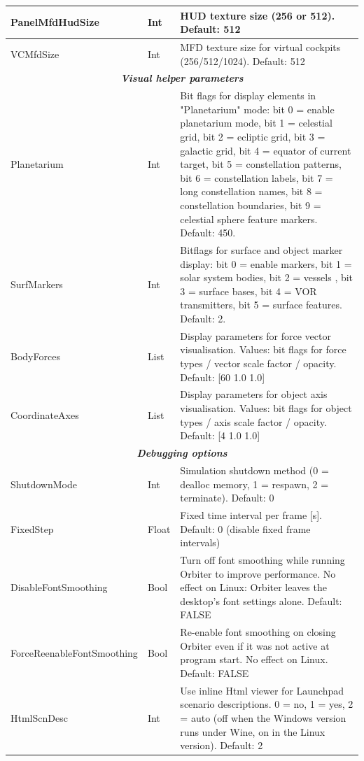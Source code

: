 \documentclass[Orbiter User Manual.tex]{subfiles}
\begin{document}
\begin{longtable}{ |p{}|p{}|p{}| }
	PanelMfdHudSize & Int & HUD texture size (256 or 512). Default: 512\\
	\hline\rule{0pt}{2ex}
	VCMfdSize & Int & MFD texture size for virtual cockpits (256/512/1024). Default: 512\\
	\hline
	\multicolumn{3}{|c|}{\rule{0pt}{2ex}\textbf{\textit{Visual helper parameters}}}\\
	\hline\rule{0pt}{2ex}
	Planetarium & Int & Bit flags for display elements in "Planetarium" mode: bit 0 = enable planetarium mode, bit 1 = celestial grid, bit 2 = ecliptic grid, bit 3 = galactic grid, bit 4 = equator of current target, bit 5 = constellation patterns, bit 6 = constellation labels, bit 7 = long constellation names, bit 8 = constellation boundaries, bit 9 = celestial sphere feature markers. Default: 450.\\
	\hline\rule{0pt}{2ex}
	SurfMarkers & Int & Bitflags for surface and object marker display: bit 0 = enable markers,  bit 1 = solar system bodies, bit 2 = vessels , bit 3 = surface bases, bit 4 = VOR transmitters, bit 5 = surface features. Default: 2.\\
	\hline\rule{0pt}{2ex}
	BodyForces & List & Display parameters for force vector visualisation. Values: bit flags for force types / vector scale factor / opacity. Default: [60 1.0 1.0]\\
	\hline\rule{0pt}{2ex}
	CoordinateAxes & List & Display parameters for object axis visualisation. Values: bit flags for object types / axis scale factor / opacity. Default: [4 1.0 1.0]\\
	\hline
	\multicolumn{3}{|c|}{\rule{0pt}{2ex}\textbf{\textit{Debugging options}}}\\
	\hline\rule{0pt}{2ex}
	ShutdownMode & Int & Simulation shutdown method (0 = dealloc memory, 1 = respawn, 2 = terminate). Default: 0\\
	\hline\rule{0pt}{2ex}
	FixedStep & Float & Fixed time interval per frame [s]. Default: 0 (disable fixed frame intervals)\\
	\hline\rule{0pt}{2ex}
	DisableFontSmoothing & Bool & Turn off font smoothing while running Orbiter to improve performance. No effect on Linux: Orbiter leaves the desktop's font settings alone. Default: FALSE\\
	\hline\rule{0pt}{2ex}
	ForceReenableFontSmoothing & Bool & Re-enable font smoothing on closing Orbiter even if it was not active at program start. No effect on Linux. Default: FALSE\\
	\hline\rule{0pt}{2ex}
	HtmlScnDesc & Int & Use inline Html viewer for Launchpad scenario descriptions. 0 = no, 1 = yes, 2 = auto (off when the Windows version runs under Wine, on in the Linux version). Default: 2\\

\end{longtable}
\end{document}
